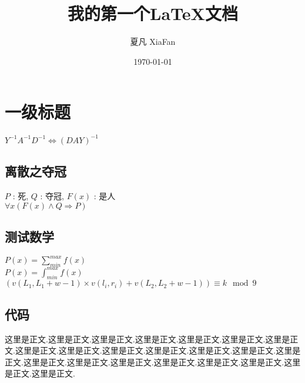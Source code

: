 \documentclass[12pt, a4paper, oneside]{article}
\title{我的第一个\LaTeX 文档}
\author{夏凡 XiaFan}
\date{\today}
\begin{document}
\maketitle

\section{一级标题}

$ Y^{-1} A^{-1} D^{-1} \iff (DAY)^{-1} $

\subsection{离散之夺冠}
\begin{center}
    $P$ : 死, $Q$ : 夺冠, $F(x)$ : 是人 \\
    ${\forall}x(F(x) \wedge Q \Rightarrow P)$
\end{center}

\subsection{测试数学}
\begin{center}
    $P(x)=\sum_{min}^{max}f(x)$ \\
    $P(x)=\int_{min}^{max}f(x)$ \\
    $(v(L_1, L_1 + w - 1) \times v(l_i, r_i) + v(L_2, L_2 + w - 1)) \equiv k \mod 9$
\end{center}

\newpage
\subsection{代码}


这里是正文.这里是正文.这里是正文.这里是正文.这里是正文.这里是正文.这里是正文.这里是正文.这里是正文.这里是正文.这里是正文.这里是正文.这里是正文.这里是正文.这里是正文.这里是正文.这里是正文.这里是正文.这里是正文.这里是正文.这里是正文.这里是正文.
\end{document}
